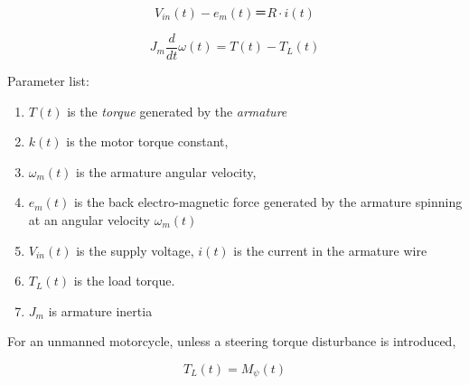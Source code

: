 \documentclass[11pt]{article}
\begin{document}
\begin{equation}
    V_{in}(t) - e_{m}(t) ＝ R \cdot i(t)
\end{equation}

\begin{equation}
    J_{m}\frac{d}{dt}\omega(t) = T(t) - T_{L}(t)
\end{equation}

Parameter list:
\begin{enumerate}
\item  $T(t)$ is the {\em torque} generated by the {\em armature}

\item $k(t)$ is the motor torque constant,
\item $\omega_{m}(t)$ is the armature angular velocity,
\item $e_{m}(t)$ is the back electro-magnetic force
generated by the armature spinning at an angular velocity $\omega_{m}(t)$
\item $V_{in}(t)$ is the supply voltage, $i(t)$ is the current in the armature wire
\item $T_{L}(t)$ is the load torque.
\item $J_{m}$ is armature inertia
\end{enumerate}


For an unmanned motorcycle, unless a steering torque disturbance is introduced,

\begin{equation}
    T_{L}(t) = M_{\psi}(t)
\end{equation}



\end{document}
